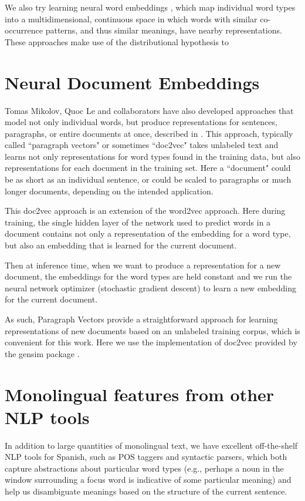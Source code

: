 We also try learning neural word embeddings \cite{mikolovword2vec}, which map
individual word types into a multidimensional, continuous space in which words
with similar co-occurrence patterns, and thus similar meanings, have nearby
representations.  These approaches make use of the distributional hypothesis to 

\section{Neural Document Embeddings}
Tomas Mikolov, Quoc Le and collaborators have also developed approaches that
model not only individual words, but produce representations for sentences,
paragraphs, or entire documents at once, described in 
\cite{dai-document-embedding-2015,quocle-distributed-representations-2014}.
This approach, typically called ``paragraph vectors" or sometimes ``doc2vec"
takes unlabeled text and learns not only representations for word types found
in the training data, but also representations for each document in the
training set. Here a ``document" could be as short as an individual sentence,
or could be scaled to paragraphs or much longer documents, depending on the
intended application.

This doc2vec approach is an extension of the word2vec approach. Here during
training, the single hidden layer of the network used to predict words in a
document contains not only a representation of the embedding for a word type,
but also an embedding that is learned for the current document.

Then at inference time, when we want to produce a representation for a new
document, the embeddings for the word types are held constant and we run the
neural network optimizer (stochastic gradient descent) to learn a new embedding
for the current document.

As such, Paragraph Vectors provide a straightforward approach for learning
representations of new documents based on an unlabeled training corpus, which
is convenient for this work. Here we use the implementation of doc2vec provided
by the gensim package \cite{rehurek-lrec}.

\section{Monolingual features from other NLP tools}
In addition to large quantities of monolingual text, we have excellent
off-the-shelf NLP tools for Spanish, such as POS taggers and syntactic parsers,
which both capture abstractions about particular word types (e.g., perhaps a
noun in the window surrounding a focus word is indicative of some particular
meaning) and help us disambiguate meanings based on the structure of the
current sentence.

